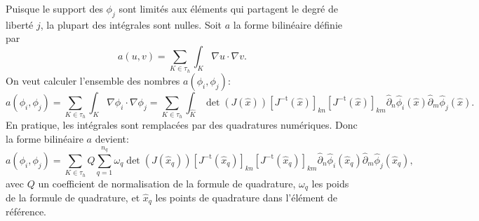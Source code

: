 Puisque le support des $\phi_j$ sont limit\'es aux \'el\'ements qui partagent le degr\'e de libert\'e $j$, la plupart des int\'egrales sont nulles. Soit $a$ la forme bilin\'eaire d\'efinie par
\begin{equation}
a(u, v) = \sum_{K\in\tau_h}\int_K \nabla u\cdot \nabla v.
\end{equation}
On veut calculer l'ensemble des nombres $a(\phi_i, \phi_j)$:
\begin{equation}
a(\phi_i, \phi_j) = \sum_{K\in\tau_h}\int_K \nabla \phi_i\cdot \nabla \phi_j = \sum_{K\in\tau_h}\int_{\hat K} \det(J(\hat x)) [J^{-\mathrm t}(\hat x)]_{kn} [J^{-\mathrm t}(\hat x)]_{km} \hat\partial_n \hat\phi_i(\hat x)\hat\partial_m \hat\phi_j(\hat x).
\end{equation}
En pratique, les int\'egrales sont remplac\'ees par des quadratures num\'eriques. Donc la forme bilin\'eaire $a$ devient:
\begin{equation}
a(\phi_i, \phi_j) = \sum_{K\in\tau_h} Q \sum_{q = 1}^{n_q}\omega_q \det(J(\hat x_q)) [J^{-\mathrm t}(\hat x_q)]_{kn} [J^{-\mathrm t}(\hat x_q)]_{km} \hat\partial_n \hat\phi_i(\hat x_q)\hat\partial_m \hat\phi_j(\hat x_q),
\end{equation}
avec $Q$ un coefficient de normalisation de la formule de quadrature, $\omega_q$ les poids de la formule de quadrature, et $\hat x_q$ les points de quadrature dans l'\'el\'ement de r\'ef\'erence.

